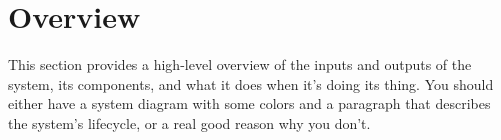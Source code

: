 \section{Overview}\label{sec:overview}

This section provides a high-level overview of the inputs and outputs of the system, its components, and what it does when it's doing its thing.
You should either have a system diagram with some colors and a paragraph that describes the system's lifecycle, or a real good reason why you don't.
